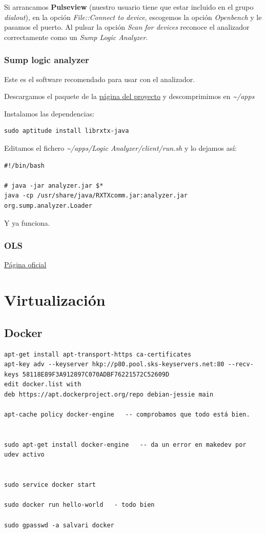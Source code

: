 \documentclass[12pt,spanish,]{scrartcl}
\begin{document}
Si arrancamos \textbf{Pulseview} (nuestro usuario tiene que estar
incluido en el grupo \emph{dialout}), en la opción \emph{File::Connect
to device}, escogemos la opción \emph{Openbench} y le pasamos el puerto.
Al pulsar la opción \emph{Scan for devices} reconoce el analizador
correctamente como un \emph{Sump Logic Analyzer}.

\subsubsection{Sump logic analyzer}\label{sump-logic-analyzer}

Este es el software recomendado para usar con el analizador.

Descargamos el paquete de la \href{https://www.sump.org}{página del
proyecto} y descomprimimos en \emph{\textasciitilde{}/apps}

Instalamos las dependencias:

\begin{verbatim}
sudo aptitude install librxtx-java
\end{verbatim}

Editamos el fichero \emph{\textasciitilde{}/apps/Logic
Analyzer/client/run.sh} y lo dejamos así:

\begin{verbatim}
#!/bin/bash

# java -jar analyzer.jar $*
java -cp /usr/share/java/RXTXcomm.jar:analyzer.jar org.sump.analyzer.Loader
\end{verbatim}

Y ya funciona.

\subsubsection{OLS}\label{ols}

\href{https://www.lxtreme.nl/ols/}{Página oficial}

\section{Virtualización}\label{virtualizaciuxf3n}

\subsection{Docker}\label{docker}

\begin{verbatim}
apt-get install apt-transport-https ca-certificates
apt-key adv --keyserver hkp://p80.pool.sks-keyservers.net:80 --recv-keys 58118E89F3A912897C070ADBF76221572C52609D
edit docker.list with
deb https://apt.dockerproject.org/repo debian-jessie main

apt-cache policy docker-engine   -- comprobamos que todo está bien.


sudo apt-get install docker-engine   -- da un error en makedev por udev activo


sudo service docker start

sudo docker run hello-world   - todo bien

sudo gpasswd -a salvari docker
\end{verbatim}
\end{document}
